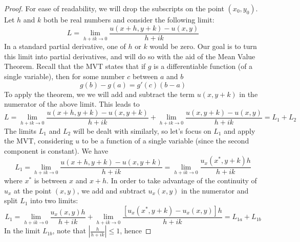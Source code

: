 \documentclass[handout]{ximera}
\begin{document}
\begin{proof}
For ease of readability, we will drop the subscripts on the point $(x_0,y_0)$.\\
Let $h$ and $k$ both be real numbers and consider the following limit:
\[
L = \lim_{h+ik \to 0} \frac{u(x+h, y+k) - u(x,y)}{h+ik} 
\]
In a standard partial derivative, one of $h$ or $k$ would be zero. 
Our goal is to turn this limit into partial derivatives,
and will do so with the aid of the Mean Value Theorem. Recall that the MVT states that 
if $g$ is a differentiable function (of a single variable), then for some number $c$ between $a$ and $b$
\[
g(b) -g(a) = g'(c)(b-a)
\]
To apply the theorem, we   
we will add and subtract the term $u(x,y+k)$ in the numerator of the above limit.
This leads to 
\[
L = \lim_{h+ik \to 0} \frac{u(x+h, y+k) - u(x,y+k)}{h+ik} + 
\lim_{h+ik \to 0} \frac{u(x, y+k) - u(x,y)}{h+ik} =  L_1 + L_2 
\]
The limits $L_1$ and $L_2$ will be dealt with similarly, so let's focus on $L_1$ and apply the MVT, 
considering $u$ to be a function of a single variable (since the second component is constant). We have
\[
L_1 = \lim_{h+ik \to 0} \frac{u(x+h, y+k) - u(x,y+k)}{h+ik} = \lim_{h+ik \to 0} \frac{u_x(x^*,y+k)h}{h+ik}
\]
where $x^*$ is between $x$ and $x+h$. In order to take advantage of the continuity of $u_x$  at 
the point $(x,y)$, 
we add and subtract $u_x(x,y)$ in the numerator and split $L_1$ into two limits:
\[
L_1 = \lim_{h+ik \to 0} \frac{u_x(x,y)h}{h+ik} + 
\lim_{h+ik \to 0} \frac{[u_x(x^*,y+k)-u_x(x,y)]h}{h+ik}= L_{1a} + L_{1b}
\]
In the limit $L_{1b}$, note that $\left|\frac{h}{h+ik}\right| \leq 1$, hence
 

\end{proof}
\end{document}
